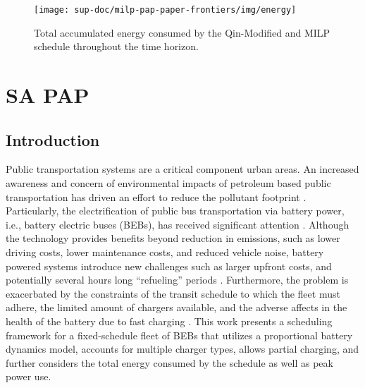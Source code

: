 \documentclass[ee,thesis]{usuthesis}
\begin{document}
\begin{figure}[htpb]
\centering
    \texttt{[image: sup-doc/milp-pap-paper-frontiers/img/energy]}
    \caption{Total accumulated energy consumed by the Qin-Modified and MILP schedule throughout the time horizon.}
    \label{fig:energy-usage}
\end{figure}

\chapter{SA PAP}
\label{sec:sa-pap}
\section{Introduction}
\label{sec:sa-introduction}
Public transportation systems are a critical component urban areas. An increased awareness and concern of environmental
impacts of petroleum based public transportation has driven an effort to reduce the pollutant footprint
\cite{de-2014-simul-elect,xylia-2018-role-charg,guida-2017-zeeus-repor-europ,li-2016-batter-elect}. Particularly,
the electrification of public bus transportation via battery power, i.e., battery electric buses (BEBs), has received
significant attention \cite{li-2016-batter-elect}. Although the technology provides benefits beyond reduction in
emissions, such as lower driving costs, lower maintenance costs, and reduced vehicle noise, battery powered systems
introduce new challenges such as larger upfront costs, and potentially several hours long ``refueling'' periods
\cite{xylia-2018-role-charg,li-2016-batter-elect}. Furthermore, the problem is exacerbated by the constraints of the
transit schedule to which the fleet must adhere, the limited amount of chargers available, and the adverse affects in
the health of the battery due to fast charging \cite{lutsey-2019-updat-elect}. This work presents a scheduling
framework for a fixed-schedule fleet of BEBs that utilizes a proportional battery dynamics model, accounts for multiple
charger types, allows partial charging, and further considers the total energy consumed by the schedule as well as peak
power use.
\end{document}
